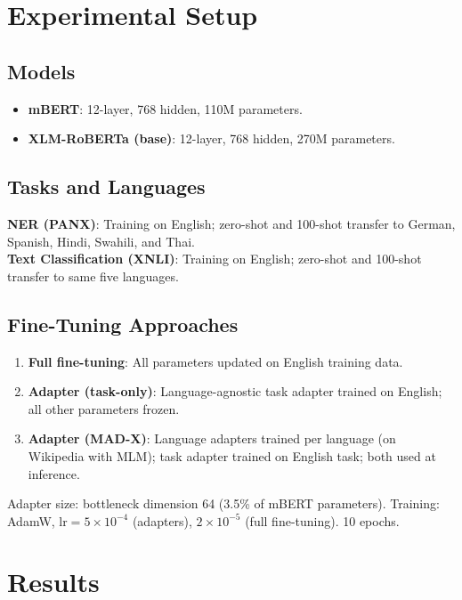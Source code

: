 \documentclass[conference]{IEEEtran}
\begin{document}
\section{Experimental Setup}

\subsection{Models}
\begin{itemize}
\item \textbf{mBERT}: 12-layer, 768 hidden, 110M parameters.
\item \textbf{XLM-RoBERTa (base)}: 12-layer, 768 hidden, 270M parameters.
\end{itemize}

\subsection{Tasks and Languages}
\textbf{NER (PANX)}: Training on English; zero-shot and 100-shot transfer to German, Spanish, Hindi, Swahili, and Thai.\\
\textbf{Text Classification (XNLI)}: Training on English; zero-shot and 100-shot transfer to same five languages.

\subsection{Fine-Tuning Approaches}
\begin{enumerate}
\item \textbf{Full fine-tuning}: All parameters updated on English training data.
\item \textbf{Adapter (task-only)}: Language-agnostic task adapter trained on English; all other parameters frozen.
\item \textbf{Adapter (MAD-X)}: Language adapters trained per language (on Wikipedia with MLM); task adapter trained on English task; both used at inference.
\end{enumerate}

Adapter size: bottleneck dimension 64 (3.5\% of mBERT parameters). Training: AdamW, $\text{lr} = 5 \times 10^{-4}$ (adapters), $2 \times 10^{-5}$ (full fine-tuning). 10 epochs.

\section{Results}
\end{document}
